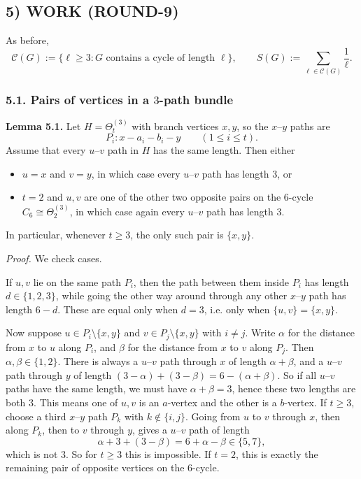 \subsection*{5) WORK (ROUND-9)}

As before,
\[
\mathcal C(G):=\{\ell\ge 3:\text{$G$ contains a cycle of length $\ell$}\},
\qquad
S(G):=\sum_{\ell\in\mathcal C(G)}\frac1\ell.
\]

\subsubsection*{5.1. Pairs of vertices in a $3$-path bundle}

\textbf{Lemma 5.1.}
Let $H=\Theta_t^{(3)}$ with branch vertices $x,y$, so the $x$--$y$ paths are
\[
P_i: x-a_i-b_i-y\qquad (1\le i\le t).
\]
Assume that every $u$--$v$ path in $H$ has the same length.
Then either
\begin{itemize}
\item $u=x$ and $v=y$, in which case every $u$--$v$ path has length $3$, or
\item $t=2$ and $u,v$ are one of the other two opposite pairs on the $6$-cycle $C_6\cong \Theta_2^{(3)}$, in which case again every $u$--$v$ path has length $3$.
\end{itemize}
In particular, whenever $t\ge 3$, the only such pair is $\{x,y\}$.

\medskip
\textit{Proof.}
We check cases.

If $u,v$ lie on the same path $P_i$, then the path between them inside $P_i$ has length $d\in\{1,2,3\}$, while going the other way around through any other $x$--$y$ path has length $6-d$.
These are equal only when $d=3$, i.e. only when $\{u,v\}=\{x,y\}$.

Now suppose $u\in P_i\setminus\{x,y\}$ and $v\in P_j\setminus\{x,y\}$ with $i\ne j$.
Write $\alpha$ for the distance from $x$ to $u$ along $P_i$, and $\beta$ for the distance from $x$ to $v$ along $P_j$.
Then $\alpha,\beta\in\{1,2\}$.
There is always a $u$--$v$ path through $x$ of length $\alpha+\beta$, and a $u$--$v$ path through $y$ of length $(3-\alpha)+(3-\beta)=6-(\alpha+\beta)$.
So if all $u$--$v$ paths have the same length, we must have $\alpha+\beta=3$, hence these two lengths are both $3$.
This means one of $u,v$ is an $a$-vertex and the other is a $b$-vertex.
If $t\ge 3$, choose a third $x$--$y$ path $P_k$ with $k\notin\{i,j\}$.
Going from $u$ to $v$ through $x$, then along $P_k$, then to $v$ through $y$, gives a $u$--$v$ path of length
\[
\alpha+3+(3-\beta)=6+\alpha-\beta\in\{5,7\},
\]
which is not $3$.
So for $t\ge 3$ this is impossible.
If $t=2$, this is exactly the remaining pair of opposite vertices on the $6$-cycle.

